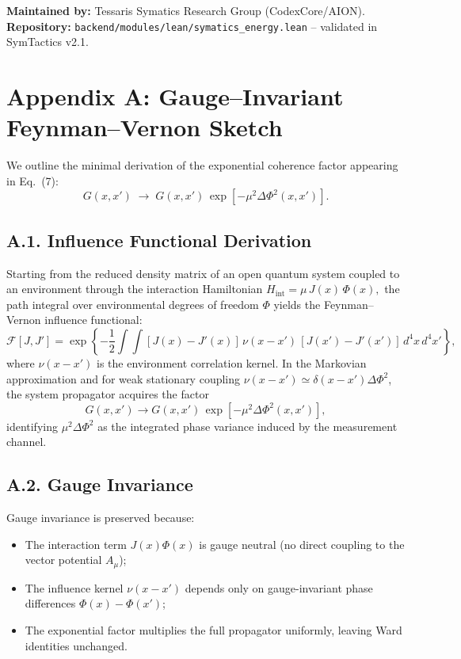 \documentclass[12pt]{article}
\begin{document}
\bigskip
\noindent
\textbf{Maintained by:} Tessaris Symatics Research Group (CodexCore/AION).\\
\textbf{Repository:} \texttt{backend/modules/lean/symatics\_energy.lean} -- validated in SymTactics v2.1.


\appendix
\section*{Appendix A: Gauge--Invariant Feynman--Vernon Sketch}

We outline the minimal derivation of the exponential coherence factor
appearing in Eq.~(7):
\[
G(x,x') \;\longrightarrow\; 
G(x,x')\,\exp[-\mu^2\Delta\Phi^2(x,x')].
\]

\subsection*{A.1. Influence Functional Derivation}

Starting from the reduced density matrix of an open quantum system
coupled to an environment through the interaction Hamiltonian
\(
H_{\mathrm{int}} = \mu\,J(x)\,\Phi(x),
\)
the path integral over environmental degrees of freedom
\(\Phi\) yields the Feynman--Vernon influence functional:
\[
\mathcal{F}[J,J'] =
\exp\!\left\{-\frac{1}{2}\!\int\!\!\int\!
[J(x)-J'(x)]\,\nu(x-x')\,[J(x')-J'(x')]\,
d^4x\,d^4x'\right\},
\]
where \(\nu(x-x')\) is the environment correlation kernel.
In the Markovian approximation and for weak stationary coupling
\(\nu(x-x') \simeq \delta(x-x')\Delta\Phi^2\),
the system propagator acquires the factor
\[
G(x,x') \rightarrow G(x,x')\,
\exp[-\mu^2\Delta\Phi^2(x,x')],
\]
identifying \(\mu^2\Delta\Phi^2\) as the integrated phase variance
induced by the measurement channel.

\subsection*{A.2. Gauge Invariance}

Gauge invariance is preserved because:
\begin{itemize}[noitemsep]
  \item The interaction term \(J(x)\Phi(x)\) is gauge neutral
        (no direct coupling to the vector potential \(A_\mu\));
  \item The influence kernel \(\nu(x-x')\) depends only on
        gauge-invariant phase differences \(\Phi(x)-\Phi(x')\);
  \item The exponential factor multiplies the full propagator
        uniformly, leaving Ward identities unchanged.
\end{itemize}
\end{document}
